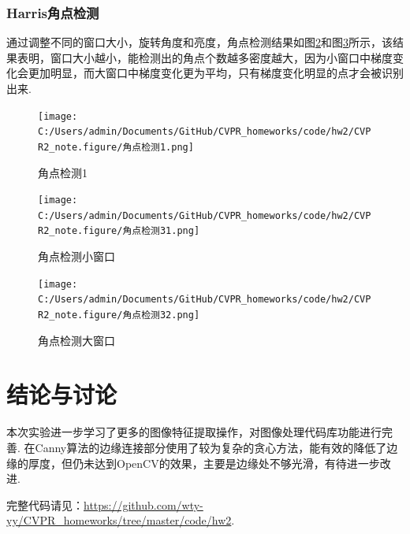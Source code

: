 \documentclass[12pt, a4paper, oneside]{ctexart}
\numberwithin{equation}{section}  %
\begin{document}
\subsubsection{Harris角点检测}
通过调整不同的窗口大小，旋转角度和亮度，角点检测结果如图\ref{fig-10}和图\ref{fig-11}所示，该结果表明，窗口大小越小，能检测出的角点个数越多密度越大，因为小窗口中梯度变化会更加明显，而大窗口中梯度变化更为平均，只有梯度变化明显的点才会被识别出来.

\begin{figure}[htbp]
    \centering
    \texttt{[image: C:/Users/admin/Documents/GitHub/CVPR\_homeworks/code/hw2/CVPR2\_note.figure/角点检测1.png]}
    \caption{角点检测1\label{fig-9}}
\end{figure}

\begin{figure}[htbp]
    \centering
    \texttt{[image: C:/Users/admin/Documents/GitHub/CVPR\_homeworks/code/hw2/CVPR2\_note.figure/角点检测31.png]}
    \caption{角点检测小窗口\label{fig-10}}
\end{figure}

\begin{figure}[htbp]
    \centering
    \texttt{[image: C:/Users/admin/Documents/GitHub/CVPR\_homeworks/code/hw2/CVPR2\_note.figure/角点检测32.png]}
    \caption{角点检测大窗口\label{fig-11}}
\end{figure}
\vspace*{-1cm}
\section{结论与讨论}
本次实验进一步学习了更多的图像特征提取操作，对图像处理代码库功能进行完善. 在Canny算法的边缘连接部分使用了较为复杂的贪心方法，能有效的降低了边缘的厚度，但仍未达到OpenCV的效果，主要是边缘处不够光滑，有待进一步改进.

完整代码请见：\url{https://github.com/wty-yy/CVPR_homeworks/tree/master/code/hw2}.
\end{document}
